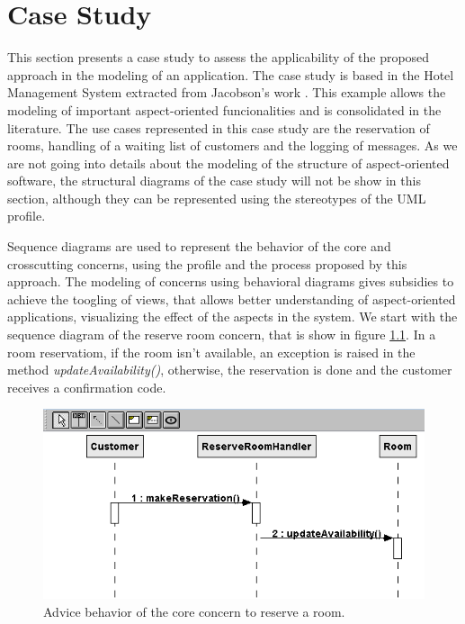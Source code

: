 \chapter{Case Study}\label{case_study}

This section presents a case study to assess the applicability of the proposed approach in the modeling of an application. The case study is based in
the Hotel Management System extracted from Jacobson{'}s work \cite{Jacobson:2004:ASD:1062430}. This example allows the modeling of important
aspect-oriented funcionalities and is consolidated in the literature. The use cases represented in this case study are the reservation of rooms,
handling of a waiting list of customers and the logging of messages. As we are not going into details about the modeling of the structure of
aspect-oriented software, the structural diagrams of the case study will not be show in this section, although they can be represented using the
stereotypes of the UML profile.

Sequence diagrams are used to represent the behavior of the core and crosscutting concerns, using the profile and the process proposed by this
approach. The modeling of concerns using behavioral diagrams gives subsidies to achieve the toogling of views, that allows better understanding of
aspect-oriented applications, visualizing the effect of the aspects in the system. We start with the sequence diagram of the reserve room concern,
that is show in figure \ref{fig:case_study_behavioral_reserve_room}. In a room reservatiom, if the room isn't available, an exception is raised in the
method \textit{updateAvailability()}, otherwise, the reservation is done and the customer receives a confirmation code.

  \begin{figure}[!b]
	\centering
	\includegraphics[scale=0.6]{img/case_study_behavioral_reserve_room.png}
	\caption{Advice behavior of the core concern to reserve a room.}\label{fig:case_study_behavioral_reserve_room}
  \end{figure}
  
